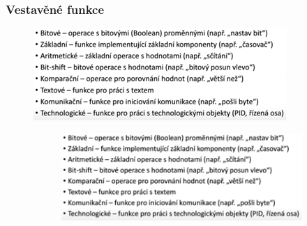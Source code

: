 \subsubsection*{Vestavěné funkce}
\begin{figure}[h] 
  \includegraphics[scale = 0.85]{img/Picture15.png}
\begin{figure}[h]
    \includegraphics[scale = 0.85]{img/Picture15.png}
\end{figure}


\end{figure}
